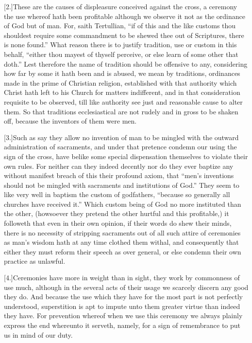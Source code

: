 [2.]These are the causes of displeasure conceived against the cross, a ceremony the use whereof hath been profitable although we observe it not as the ordinance of God but of man. For, saith Tertullian, “if of this and the like customs thou shouldest require some commandment to be shewed thee out of Scriptures, there is none found.” What reason there is to justify tradition, use or custom in this behalf, “either thou mayest of thyself perceive, or else learn of some other that doth.” Lest therefore the name of tradition should be offensive to any, considering how far by some it hath been and is abused, we mean by traditions, ordinances made in the prime of Christian religion, established with that authority which Christ hath left to his Church for matters indifferent, and in that consideration requisite to be observed, till like authority see just and reasonable cause to alter them. So that traditions ecclesiastical are not rudely and in gross to be shaken off, because the inventors of them were men.

[3.]Such as say they allow no invention of man to be  mingled with the outward administration of sacraments, and under that pretence condemn our using the sign of the cross, have belike some special dispensation themselves to violate their own rules.
 For neither can they indeed decently nor do they ever baptize any without manifest breach of this their profound axiom, that “men’s inventions should not be mingled with sacraments and institutions of God.” They seem to like very well in baptism the custom of godfathers, “because so generally all churches have received it.” Which custom being of God no more instituted than the other, (howsoever they pretend the other hurtful and this profitable,) it followeth that even in their own opinion, if their words do shew their minds, there is no necessity of stripping sacraments out of all such attire of ceremonies as man’s wisdom hath at any time clothed them withal, and consequently that either they must reform their speech as over general, or else condemn their own practice as unlawful.

[4.]Ceremonies have more in weight than in sight, they work by commonness of use much, although in the several acts of their usage we scarcely discern any good they do. And because the use which they have for the most part is not perfectly understood, superstition is apt to impute unto them greater virtue than indeed they have. For prevention whereof when we use this ceremony we always plainly express the end whereunto it serveth, namely, for a sign of remembrance to put us in mind of our duty.

